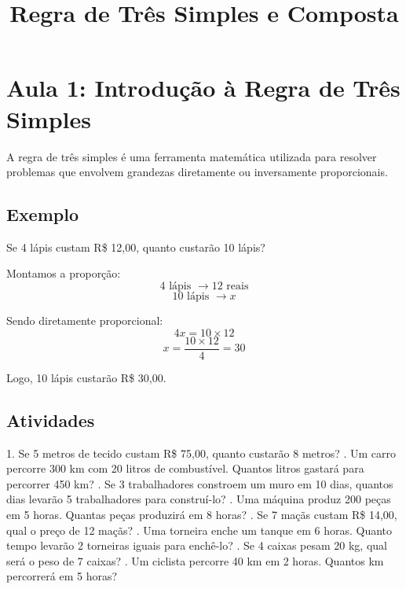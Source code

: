 \documentclass[a4paper,12pt]{article}
\title{Regra de Três Simples e Composta}
\author{}
\date{}
\begin{document}
\maketitle

\section{Aula 1: Introdução à Regra de Três Simples}

A regra de três simples é uma ferramenta matemática utilizada para resolver problemas que envolvem grandezas diretamente ou inversamente proporcionais.

\subsection*{Exemplo}
Se 4 lápis custam R\$ 12,00, quanto custarão 10 lápis?

Montamos a proporção:
\[ 4 \text{ lápis } \rightarrow 12 \text{ reais} \]
\[ 10 \text{ lápis } \rightarrow x \]

Sendo diretamente proporcional:
\[ 4x = 10 \times 12 \]
\[ x = \frac{10 \times 12}{4} = 30 \]

Logo, 10 lápis custarão R\$ 30,00.

\subsection*{Atividades}

1. Se 5 metros de tecido custam R\$ 75,00, quanto custarão 8 metros?  . Um carro percorre 300 km com 20 litros de combustível. Quantos litros gastará para percorrer 450 km? . Se 3 trabalhadores constroem um muro em 10 dias, quantos dias levarão 5 trabalhadores para construí-lo? . Uma máquina produz 200 peças em 5 horas. Quantas peças produzirá em 8 horas? . Se 7 maçãs custam R\$ 14,00, qual o preço de 12 maçãs? . Uma torneira enche um tanque em 6 horas. Quanto tempo levarão 2 torneiras iguais para enchê-lo? . Se 4 caixas pesam 20 kg, qual será o peso de 7 caixas? . Um ciclista percorre 40 km em 2 horas. Quantos km percorrerá em 5 horas? \newline
\end{document}
